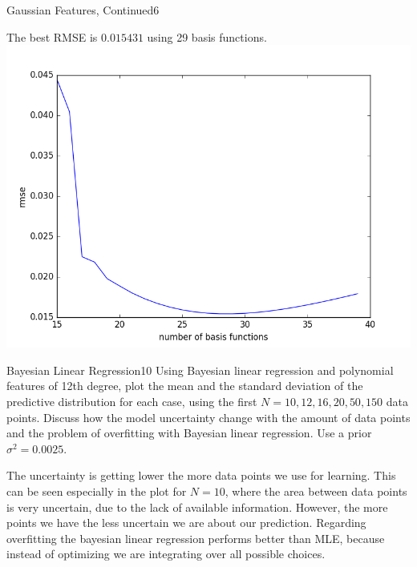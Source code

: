 \begin{questions}
\begin{question}{Gaussian Features, Continued}{6}
\begin{answer}\end{answer}
The best RMSE is $0.015431$ using 29 basis functions. \\
\centering \includegraphics[width=1.0\linewidth]{img/31c_rmse}\label{fig:gaussians_rmse}

\end{question}


\begin{question}{Bayesian Linear Regression}{10}
Using Bayesian linear regression and polynomial features of 12th degree, plot the mean and the standard deviation of the predictive distribution for each case, using the first $N={10, 12, 16, 20, 50, 150}$ data points.
Discuss how the model uncertainty change with the amount of data points and the problem of overfitting with Bayesian linear regression. Use a prior $\sigma^2=0.0025$.

\begin{answer}
The uncertainty is getting lower the more data points we use for learning. This can be seen especially in the plot for $N=10$, where the area between data points is very uncertain, due to the lack of available information. However, the more points we have the less uncertain we are about our prediction. Regarding overfitting the bayesian linear regression performs better than MLE, because instead of optimizing we are integrating over all possible choices.


\end{answer}
\end{question}
\end{questions}
